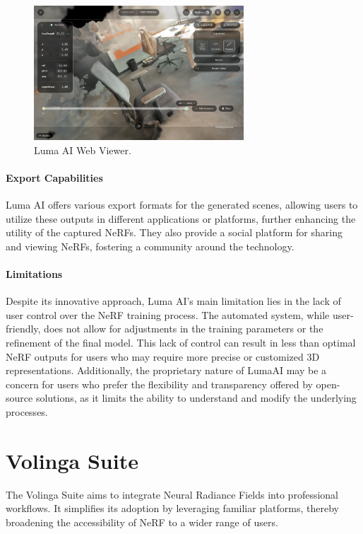 \begin{figure}[h!]
  \centering
  \includegraphics[width=0.7\textwidth]{figures/related-luma.png}
  \caption{Luma AI Web Viewer.}
  \label{fig:luma-viewer}
\end{figure}

\paragraph{Export Capabilities}
Luma AI offers various export formats for the generated scenes, allowing users to utilize these outputs in different applications or platforms, further enhancing the utility of the captured NeRFs.
They also provide a social platform for sharing and viewing NeRFs, fostering a community around the technology.

\paragraph{Limitations}
Despite its innovative approach, Luma AI's main limitation lies in the lack of user control over the NeRF training process.
The automated system, while user-friendly, does not allow for adjustments in the training parameters or the refinement of the final model.
This lack of control can result in less than optimal NeRF outputs for users who may require more precise or customized 3D representations.
Additionally, the proprietary nature of LumaAI may be a concern for users who prefer the flexibility and transparency offered by open-source solutions, as it limits the ability to understand and modify the underlying processes.

\section{Volinga Suite}

The Volinga Suite \cite{noauthor_volinga_nodate} aims to integrate Neural Radiance Fields into professional workflows.
It simplifies its adoption by leveraging familiar platforms, thereby broadening the accessibility of NeRF to a wider range of users.

